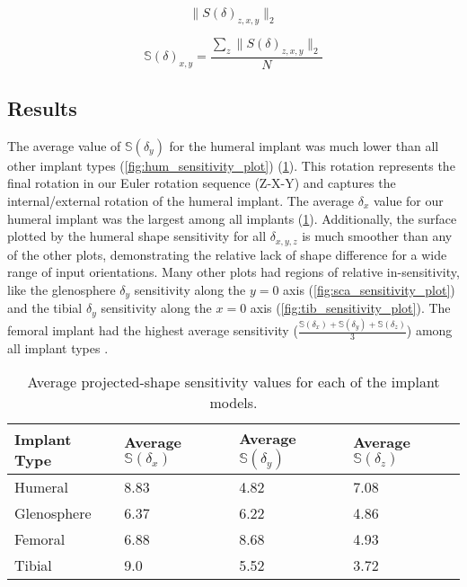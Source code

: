 \begin{equation}
	\label{eq:euc_norm}
	\|S(\delta)_{z,x,y}\|_{2}
\end{equation}

\begin{equation}
	\label{eq:z_rot_norm}
	\mathbb{S}(\delta)_{x,y} = \dfrac{\sum_{z} \| S(\delta)_{z,x,y} \|_{2}}{N}
\end{equation}

\subsection{Results}

The average value of $\mathbb{S}(\delta_{y})$ for the humeral implant was much lower than all other implant types (\cref{fig:hum_sensitivity_plot}) (\cref{tab:ss-vals}).
This rotation represents the final rotation in our Euler rotation sequence (Z-X-Y) and captures the internal/external rotation of the humeral implant.
The average $\delta_{x}$ value for our humeral implant was the largest among all implants (\cref{tab:ss-vals}).
Additionally, the surface plotted by the humeral shape sensitivity for all $\delta_{x,y,z}$ is much smoother than any of the other plots, demonstrating the relative lack of shape difference for a wide range of input orientations.
Many other plots had regions of relative in-sensitivity, like the glenosphere $\delta_{y}$ sensitivity along the $y=0$ axis (\cref{fig:sca_sensitivity_plot}) and the tibial $\delta_{y}$ sensitivity along the $x=0$ axis (\cref{fig:tib_sensitivity_plot}).
The femoral implant had the highest average sensitivity ($\frac{\mathbb{S}(\delta_{x}) +\mathbb{S}(\delta_{y}) +\mathbb{S}(\delta_{z})  }{3}$) among all implant types .


\begin{table}
	\caption{Average projected-shape sensitivity values for each of the implant models.} \label{tab:ss-vals}
	\begin{tabularx}{\textwidth}{|X|X|X|X|}\hline
		{\bf Implant Type} & Average $\mathbb{S}(\delta_{x})$ & Average  $\mathbb{S}(\delta_{y})$ & Average $\mathbb{S}(\delta_{z})$ \\ \hline
		Humeral            & 8.83                             & 4.82                              & 7.08                             \\\hline
		Glenosphere        & 6.37                             & 6.22                              & 4.86                             \\\hline
		Femoral            & 6.88                             & 8.68                              & 4.93                             \\\hline
		Tibial             & 9.0                              & 5.52                              & 3.72                             \\\hline
	\end{tabularx}
\end{table}


